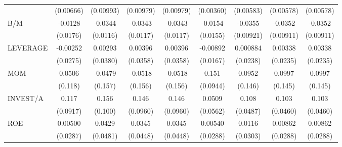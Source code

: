 \begin{table}[htbp]
\begin{tabular}{l*{8}{c}}
                    &   (0.00666)         &   (0.00993)         &   (0.00979)         &   (0.00979)         &   (0.00360)         &   (0.00583)         &   (0.00578)         &   (0.00578)         \\
B/M                 &     -0.0128         &     -0.0344\sym{***}&     -0.0343\sym{***}&     -0.0343\sym{***}&     -0.0154         &     -0.0355\sym{***}&     -0.0352\sym{***}&     -0.0352\sym{***}\\
                    &    (0.0176)         &    (0.0116)         &    (0.0117)         &    (0.0117)         &    (0.0155)         &   (0.00921)         &   (0.00911)         &   (0.00911)         \\
LEVERAGE            &    -0.00252         &     0.00293         &     0.00396         &     0.00396         &    -0.00892         &    0.000884         &     0.00338         &     0.00338         \\
                    &    (0.0275)         &    (0.0380)         &    (0.0358)         &    (0.0358)         &    (0.0167)         &    (0.0238)         &    (0.0235)         &    (0.0235)         \\
MOM                 &      0.0506         &     -0.0479         &     -0.0518         &     -0.0518         &       0.151         &      0.0952         &      0.0997         &      0.0997         \\
                    &     (0.118)         &     (0.157)         &     (0.156)         &     (0.156)         &    (0.0944)         &     (0.146)         &     (0.145)         &     (0.145)         \\
INVEST/A            &       0.117         &       0.156         &       0.146         &       0.146         &      0.0509         &       0.108\sym{**} &       0.103\sym{**} &       0.103\sym{**} \\
                    &    (0.0917)         &     (0.100)         &    (0.0960)         &    (0.0960)         &    (0.0562)         &    (0.0487)         &    (0.0460)         &    (0.0460)         \\
ROE                 &     0.00500         &      0.0429         &      0.0345         &      0.0345         &     0.00540         &      0.0116         &     0.00862         &     0.00862         \\
                    &    (0.0287)         &    (0.0481)         &    (0.0448)         &    (0.0448)         &    (0.0288)         &    (0.0303)         &    (0.0288)         &    (0.0288)         \\

\end{tabular}
\end{table}
